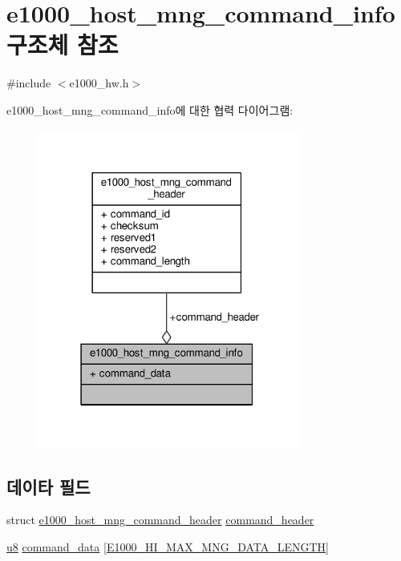 \hypertarget{structe1000__host__mng__command__info}{}\section{e1000\+\_\+host\+\_\+mng\+\_\+command\+\_\+info 구조체 참조}
\label{structe1000__host__mng__command__info}


{\ttfamily \#include $<$e1000\+\_\+hw.\+h$>$}



e1000\+\_\+host\+\_\+mng\+\_\+command\+\_\+info에 대한 협력 다이어그램\+:
\nopagebreak
\begin{figure}[H]
\begin{center}
\leavevmode
\includegraphics[width=247pt]{structe1000__host__mng__command__info__coll__graph}
\end{center}
\end{figure}
\subsection*{데이타 필드}
\begin{DoxyCompactItemize}
\item 
struct \hyperlink{structe1000__host__mng__command__header}{e1000\+\_\+host\+\_\+mng\+\_\+command\+\_\+header} \hyperlink{structe1000__host__mng__command__info_a29cc0985a69d0e46462897093986d94c}{command\+\_\+header}
\item 
\hyperlink{lib_2igb_2e1000__osdep_8h_a8baca7e76da9e0e11ce3a275dd19130c}{u8} \hyperlink{structe1000__host__mng__command__info_a4e3d176e805d3f02cb8e8a8b4021f094}{command\+\_\+data} \mbox{[}\hyperlink{kmod_2igb_2e1000__hw_8h_aaeaaa1652f5af217f952ca8083d8c76f}{E1000\+\_\+\+H\+I\+\_\+\+M\+A\+X\+\_\+\+M\+N\+G\+\_\+\+D\+A\+T\+A\+\_\+\+L\+E\+N\+G\+TH}\mbox{]}
\end{DoxyCompactItemize}


